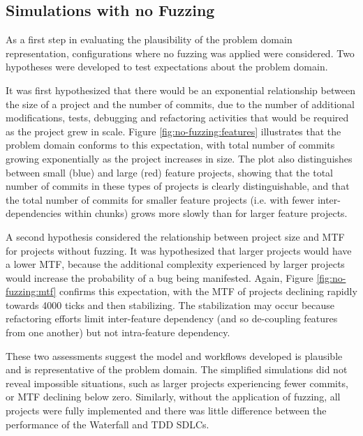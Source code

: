 \documentclass{llncs}
\begin{document}

\subsection{Simulations with no Fuzzing}


As a first step in evaluating the plausibility of the problem domain representation, configurations where no fuzzing was
applied were considered.  Two hypotheses were developed to test expectations about the problem domain.

It was first hypothesized that there would be an exponential relationship between the size of a project and the number
of commits, due to the number of additional modifications, tests, debugging and refactoring activities that would be
required as the project grew in scale.  Figure \ref{fig:no-fuzzing:features} illustrates that the problem domain
conforms to this expectation, with total number of commits growing exponentially as the project increases in size.  The
plot also distinguishes between small (blue) and large (red) feature projects, showing that the total number of commits
in these types of projects is clearly distinguishable, and that the total number of commits for smaller feature projects
(i.e. with fewer inter-dependencies within chunks) grows more slowly than for larger feature projects.

A second hypothesis considered the relationship between project size and MTF for projects without fuzzing. It was
hypothesized that larger projects would have a lower MTF, because the additional complexity experienced by larger
projects would increase the probability of a bug being manifested.  Again, Figure \ref{fig:no-fuzzing:mtf} confirms this
expectation, with the MTF of projects declining rapidly towards 4000 ticks and then stabilizing.  The stabilization may
occur because refactoring efforts limit inter-feature dependency (and so de-coupling features from one another) but not
intra-feature dependency.

These two assessments suggest the model and workflows developed is plausible and is representative of the problem
domain.  The simplified simulations did not reveal impossible situations, such as larger projects experiencing fewer
commits, or MTF declining below zero.  Similarly, without the application of fuzzing, all projects were fully
implemented and there was little difference between the performance of the Waterfall and TDD SDLCs.
\end{document}
